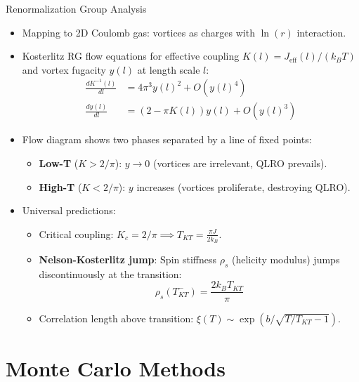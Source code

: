 \documentclass[11pt,aspectratio=169]{beamer}
\begin{document}
\begin{frame}{Renormalization Group Analysis}
    \begin{itemize}
        \item Mapping to 2D Coulomb gas: vortices as charges with $\ln(r)$ interaction.
        \item Kosterlitz RG flow equations for effective coupling $K(l) = J_{\text{eff}}(l)/(k_B T)$ and vortex fugacity $y(l)$ at length scale $l$:
        \begin{align}
            \frac{d K^{-1}(l)}{dl} &= 4 \pi^3 y(l)^2 + O(y(l)^4) \\
            \frac{d y(l)}{dl} &= (2 - \pi K(l)) y(l) + O(y(l)^3)
        \end{align}
        \pause
        \item Flow diagram shows two phases separated by a line of fixed points:
        \begin{itemize}
            \item \textbf{Low-T} ($K > 2/\pi$): $y \to 0$ (vortices are irrelevant, QLRO prevails).
            \item \textbf{High-T} ($K < 2/\pi$): $y$ increases (vortices proliferate, destroying QLRO).
        \end{itemize}
        \pause
        \item Universal predictions:
        \begin{itemize}
            \item Critical coupling: $K_c = 2/\pi \implies T_{KT} = \frac{\pi J}{2k_B}$.
            \item \textbf{Nelson-Kosterlitz jump}: Spin stiffness $\rho_s$ (helicity modulus) jumps discontinuously at the transition:
            \begin{equation}
                \rho_s(T_{KT}^-) = \frac{2k_B T_{KT}}{\pi}
            \end{equation}
            \item Correlation length above transition: $\xi(T) \sim \exp(b/\sqrt{T/T_{KT}-1})$.
        \end{itemize}
    \end{itemize}
\end{frame}

\section{Monte Carlo Methods}
\end{document}

